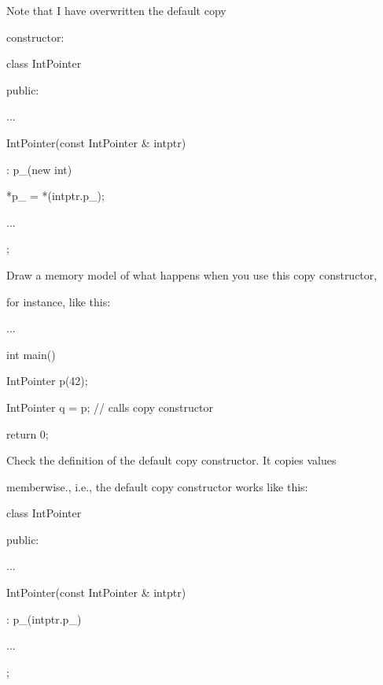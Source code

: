 Note that I have overwritten the default copy

constructor:



\begin{consolethree}[escapeinside=||]

class IntPointer

{

public:

    ...

    IntPointer(const IntPointer & intptr)

        : p_(new int)

    {

        *p_ = *(intptr.p_);

    }

    ...

};

\end{consolethree}



Draw a memory model of what happens when you use this copy constructor,

for instance, like this:



\begin{consolethree}[escapeinside=||]

...

int main()

{

    IntPointer p(42);

    IntPointer q = p; // calls copy constructor

    return 0;

}

\end{consolethree}



Check the definition of the default copy constructor. It copies values

memberwise., i.e., the default copy constructor works like this:



\begin{consolethree}[escapeinside=||]

class IntPointer

{

public:

    ...

    IntPointer(const IntPointer & intptr)

        : p_(intptr.p_)

    {}

    ...

};

\end{consolethree}



